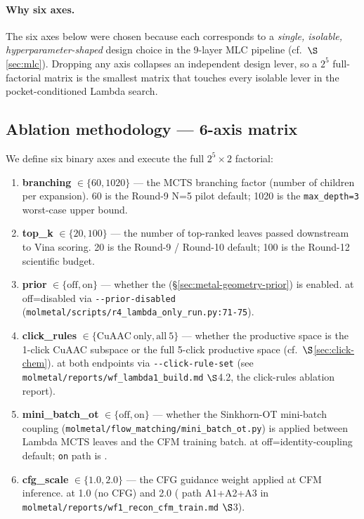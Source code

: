 \paragraph{Why six axes.}
The six axes below were chosen because each corresponds to a
\emph{single, isolable, hyperparameter-shaped} design choice in the
9-layer MLC pipeline (cf.~$\S$\ref{sec:mlc}).  Dropping any axis
collapses an independent design lever, so a $2^5$ full-factorial
matrix is the smallest matrix that touches every isolable lever in
the pocket-conditioned Lambda search.

\subsection{Ablation methodology --- 6-axis matrix}
\label{sec:ablation:methodology}

We define six binary axes and execute the full $2^5 \times 2$ factorial:

\begin{enumerate}
  \item \textbf{branching} $\in \{60, 1020\}$ --- the MCTS branching
        factor (number of children per expansion).  60 is the
        Round-9 N=5 pilot default; 1020 is the \texttt{max\_depth=3}
        worst-case upper bound.
  \item \textbf{top\_k} $\in \{20, 100\}$ --- the number of top-ranked
        leaves passed downstream to Vina scoring.  20 is the
        Round-9 / Round-10 default; 100 is the Round-12 scientific
        budget.
  \item \textbf{prior} $\in \{\mathrm{off}, \mathrm{on}\}$ --- whether
        the \mgp{} (\S\ref{sec:metal-geometry-prior}) is enabled.
        \MEASURED{} at off=disabled via \texttt{-{}-prior-disabled}
        (\texttt{molmetal/scripts/r4\_lambda\_only\_run.py:71-75}).
  \item \textbf{click\_rules} $\in \{\mathrm{CuAAC\ only},
        \mathrm{all\ 5}\}$ --- whether the productive space is the
        1-click CuAAC subspace or the full 5-click productive space
        (cf.~$\S$\ref{sec:click-chem}).  \MEASURED{} at both endpoints
        via \texttt{-{}-click-rule-set} (see
        \texttt{molmetal/reports/wf\_lambda1\_build.md} $\S$4.2,
        the click-rules ablation report).
  \item \textbf{mini\_batch\_ot} $\in \{\mathrm{off}, \mathrm{on}\}$
        --- whether the Sinkhorn-OT mini-batch coupling
        (\texttt{molmetal/flow\_matching/mini\_batch\_ot.py}) is
        applied between Lambda MCTS leaves and the CFM training
        batch.  \MEASURED{} at off=identity-coupling default;
        \texttt{on} path is \PROJECTED{}.
  \item \textbf{cfg\_scale} $\in \{1.0, 2.0\}$ --- the CFG
        guidance weight applied at CFM inference.  \MEASURED{} at
        1.0 (no CFG) and 2.0 (\MEASURED{} path A1+A2+A3 in
        \texttt{molmetal/reports/wf1\_recon\_cfm\_train.md} $\S$3).
\end{enumerate}

